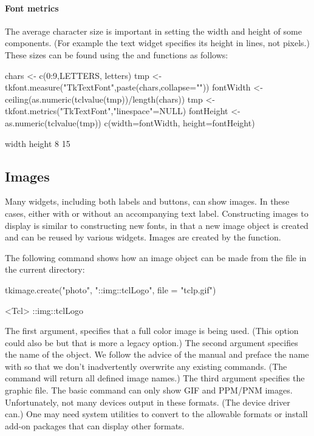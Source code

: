 \paragraph{Font metrics}
The average character size is important in setting the width and
height of some components. (For example the text widget specifies its
height in lines, not pixels.) These sizes can be found using the
 and  functions as
follows:
\begin{Schunk}
\begin{Sinput}
 chars <- c(0:9,LETTERS, letters)
 tmp <- tkfont.measure("TkTextFont",paste(chars,collapse=""))
 fontWidth <- ceiling(as.numeric(tclvalue(tmp))/length(chars))
 tmp <- tkfont.metrics("TkTextFont","linespace"=NULL)
 fontHeight <- as.numeric(tclvalue(tmp))
 c(width=fontWidth, height=fontHeight)
\end{Sinput}
\begin{Soutput}
 width height 
     8     15 
\end{Soutput}
\end{Schunk}


\subsection{Images}
\label{sec:tcltk:overview:images}


Many  widgets, including both labels and buttons, can show
images. In these cases, either with or without an accompanying text
label. Constructing images to display is similar to constructing new
fonts, in that a new image object is created and can be reused by
various widgets. Images are created by the 
function. 

The following command shows how an image object can be made from the
file  in the current directory:

\begin{Schunk}
\begin{Sinput}
 tkimage.create("photo", "::img::tclLogo", file = "tclp.gif")
\end{Sinput}
\begin{Soutput}
<Tcl> ::img::tclLogo 
\end{Soutput}
\end{Schunk}


The first argument,  specifies that a full color image is
being used. (This option could also be  but that is more
a legacy option.) The second argument specifies the name of the
object. We follow the advice of the \TK\/ manual and preface the name
with  so that we don't inadvertently overwrite any
existing \TCL\/ commands. (The command 
will return all defined image names.) The third argument
 specifies the graphic file. The basic
\TK\/  command can only show GIF and PPM/PNM
images. Unfortunately, not many \R\/ devices output in these
formats. (The  device driver can.) One may need system
utilities to convert to the allowable formats or install add-on \TCL\/
packages that can display other formats.

